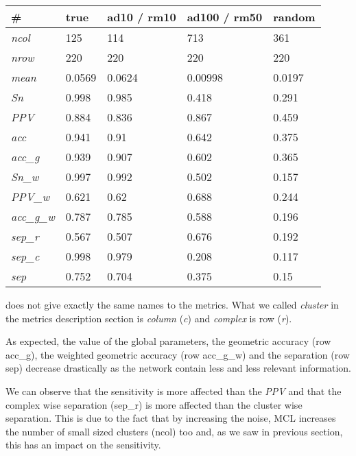\begin{tabular}{|l|l|l|l|l|}
\hline
\# & \textbf{true }& \textbf{ad10 / rm10} & \textbf{ad100 / rm50} & \textbf{random} \\ \hline
\textit{ncol} & 125 & 114 & 713 & 361 \\ \hline
\textit{nrow} & 220 & 220 & 220 & 220 \\ \hline
\textit{mean} & 0.0569 & 0.0624 & 0.00998 & 0.0197 \\ \hline
\textit{Sn} & 0.998 & 0.985 & 0.418 & 0.291 \\ \hline
\textit{PPV} & 0.884 & 0.836 & 0.867 & 0.459 \\ \hline
\textit{acc} & 0.941 & 0.91 & 0.642 & 0.375 \\ \hline
\textit{acc\_g} & 0.939 & 0.907 & 0.602 & 0.365 \\ \hline
\textit{Sn\_w} & 0.997 & 0.992 & 0.502 & 0.157 \\ \hline
\textit{PPV\_w} & 0.621 & 0.62 & 0.688 & 0.244 \\ \hline
\textit{acc\_g\_w} & 0.787 & 0.785 & 0.588 & 0.196 \\ \hline
\textit{sep\_r} & 0.567 & 0.507 & 0.676 & 0.192 \\ \hline
\textit{sep\_c} & 0.998 & 0.979 & 0.208 & 0.117 \\ \hline
\textit{sep} & 0.752 & 0.704 & 0.375 & 0.15 \\ \hline
\end{tabular}


 does not give exactly the same names to the metrics. What we called \textit{cluster} in the metrics description section is \textit{column} (\textit{c}) and \textit{complex} is row (\textit{r}).

As expected, the value of the global parameters, the geometric accuracy (row acc\_g), the weighted geometric accuracy (row acc\_g\_w) and the separation (row sep) decrease drastically as the network contain less and less relevant information.

We can observe that the sensitivity is more affected than the \textit{PPV} and that the complex wise separation (sep\_r) is more affected than the cluster wise separation. This is due to the fact that by increasing the noise, MCL increases the number of small sized clusters (ncol) too and, as we saw in previous section, this has an impact on the sensitivity.

